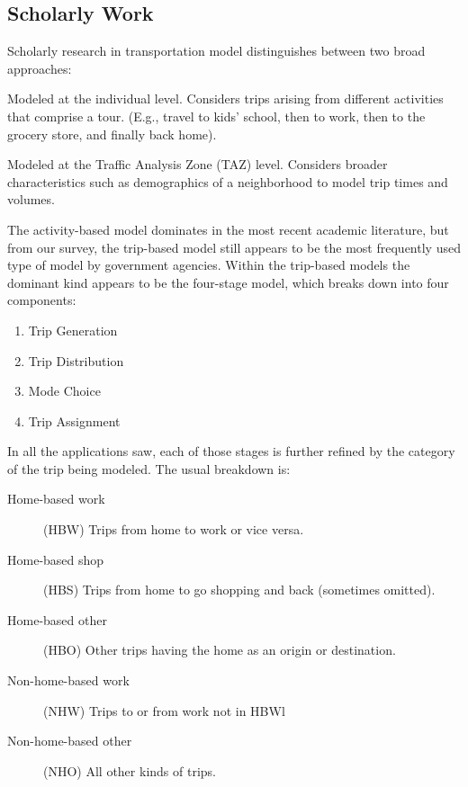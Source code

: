 
\subsection{Scholarly Work}
Scholarly research in transportation model distinguishes between two
broad approaches: \cite{kitamura1988}

\begin{description}[style=nextline]
    \item[Activity-based] Modeled at the individual level. Considers
  trips arising from different activities that comprise a tour. (E.g.,
  travel to kids' school, then to work, then to the grocery store, and
  finally back home). \cite{kitamura1988}
    \item[Trip-based] Modeled at the Traffic Analysis Zone (TAZ)
  level. Considers broader characteristics such as demographics of a
  neighborhood to model trip times and volumes.\cite{murthy01}
\end{description}

The activity-based model dominates in the most recent academic
literature, but from our survey, the trip-based model still appears to
be the most frequently used type of model by government
agencies. Within the trip-based models the dominant kind appears to be
the four-stage model, which breaks down into four components:
\cite{murthy01}

\begin{enumerate}
    \item Trip Generation
    \item Trip Distribution
    \item Mode Choice
    \item Trip Assignment
\end{enumerate}

In all the applications saw, each of those stages is further refined
by the category of the trip being modeled. The usual breakdown is:

\begin{description}
  \item[Home-based work] (HBW) Trips from home to work or vice versa.
  \item[Home-based shop] (HBS) Trips from home to go shopping and back
(sometimes omitted).
  \item[Home-based other](HBO) Other trips having the home as an
origin or destination.
  \item[Non-home-based work] (NHW) Trips to or from work not in HBWl
  \item[Non-home-based other](NHO) All other kinds of trips.
\end{description}


